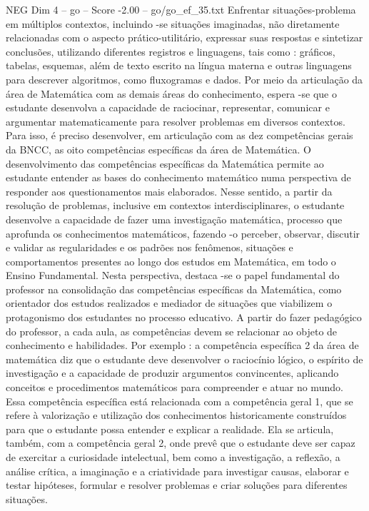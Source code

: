\begin{textsample}{NEG Dim 4 – go – Score -2.00 – go/go\_ef\_35.txt}
Enfrentar situações-problema em múltiplos contextos, incluindo -se situações imaginadas, não diretamente relacionadas com o aspecto prático-utilitário, expressar suas respostas e sintetizar conclusões, utilizando diferentes registros e linguagens, tais como : gráficos, tabelas, esquemas, além de texto escrito na língua materna e outras linguagens para descrever algoritmos, como fluxogramas e dados.
Por meio da articulação da área de Matemática com as demais áreas do conhecimento, espera -se que o estudante desenvolva a capacidade de raciocinar, representar, comunicar e argumentar matematicamente para resolver problemas em diversos contextos.
Para isso, é preciso desenvolver, em articulação com as dez competências gerais da BNCC, as oito competências específicas da área de Matemática.
O desenvolvimento das competências específicas da Matemática permite ao estudante entender as bases do conhecimento matemático numa perspectiva de responder aos questionamentos mais elaborados.
Nesse sentido, a partir da resolução de problemas, inclusive em contextos interdisciplinares, o estudante desenvolve a capacidade de fazer uma investigação matemática, processo que aprofunda os conhecimentos matemáticos, fazendo -o perceber, observar, discutir e validar as regularidades e os padrões nos fenômenos, situações e comportamentos presentes ao longo dos estudos em Matemática, em todo o Ensino Fundamental.
Nesta perspectiva, destaca -se o papel fundamental do professor na consolidação das competências específicas da Matemática, como orientador dos estudos realizados e mediador de situações que viabilizem o protagonismo dos estudantes no processo educativo.
A partir do fazer pedagógico do professor, a cada aula, as competências devem se relacionar ao objeto de conhecimento e habilidades.
Por exemplo : a competência específica 2 da área de matemática diz que o estudante deve desenvolver o raciocínio lógico, o espírito de investigação e a capacidade de produzir argumentos convincentes, aplicando conceitos e procedimentos matemáticos para compreender e atuar no mundo.
Essa competência específica está relacionada com a competência geral 1, que se refere à valorização e utilização dos conhecimentos historicamente construídos para que o estudante possa entender e explicar a realidade.
Ela se articula, também, com a competência geral 2, onde prevê que o estudante deve ser capaz de exercitar a curiosidade intelectual, bem como a investigação, a reflexão, a análise crítica, a imaginação e a criatividade para investigar causas, elaborar e testar hipóteses, formular e resolver problemas e criar soluções para diferentes situações.

\end{textsample}
